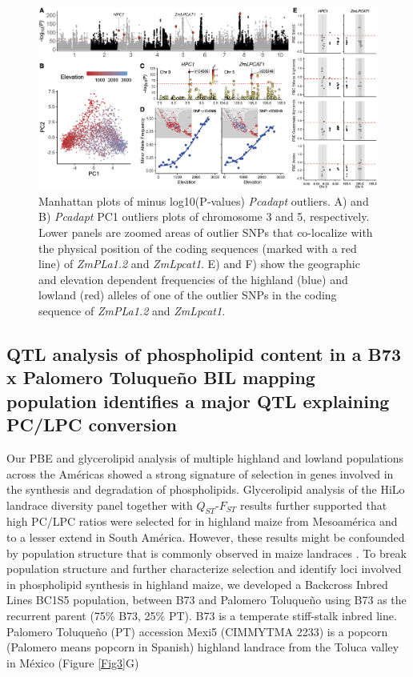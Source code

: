 \documentclass[9pt,twocolumn,twoside]{BioRxiv}
\begin{document}
\begin{figure}[h]
\begin{center}
\includegraphics[width=0.4\paperwidth]{Figures/Fig_2.png}
\caption{Manhattan plots of minus log10(P‐values) \textit{Pcadapt} outliers. A) and B) \textit{Pcadapt} PC1 outliers plots of chromosome 3 and 5, respectively. 
Lower panels are zoomed areas of outlier SNPs that co-localize with the physical position of the coding sequences (marked with a red line) of \textit{ZmPLa1.2} and \textit{ZmLpcat1}. E) and F) show the geographic and elevation dependent frequencies of the highland (blue) and lowland (red) alleles of one of the outlier SNPs in the coding sequence of \textit{ZmPLa1.2} and \textit{ZmLpcat1}.}
\label{Fig2}
\end{center}
\end{figure} 

\subsection{QTL analysis of phospholipid content in a B73 x Palomero Toluqueño BIL mapping population identifies a major QTL explaining PC/LPC conversion} 

Our PBE and glycerolipid analysis of multiple highland and lowland populations across the Américas showed a strong signature of selection in genes involved in the synthesis and degradation of phospholipids. 
Glycerolipid analysis of the HiLo landrace diversity panel together with $Q_{ST}$-$F_{ST}$ results further supported that high PC/LPC ratios were selected for in highland maize from Mesoamérica and to a lesser extend in South América.   
However, these results might be confounded by population structure that is commonly observed in maize landraces \citep{Romero_Navarro2017-cn}. 
To break population structure and further characterize selection and identify loci involved in phospholipid synthesis in highland maize, we developed a Backcross Inbred  Lines BC1S5 population, between B73 and Palomero Toluqueño using B73 as the recurrent parent (75\% B73, 25\% PT). 
B73 is a temperate stiff-stalk inbred line. Palomero Toluqueño (PT) accession Mexi5 (CIMMYTMA 2233) is a popcorn (Palomero means popcorn in Spanish) highland landrace from the Toluca valley in México (Figure \ref{Fig3}G) 
\end{document}
